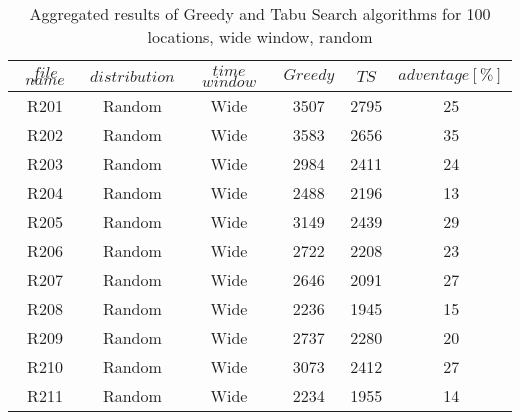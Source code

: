\begin{table}[t]
\centering
\caption{
Aggregated results of Greedy and Tabu Search algorithms for 100 locations, wide window, random}
\begin{tabular*}{0.8\linewidth}{@{\extracolsep{\fill}}cccccc}
\toprule
$file$ $name$ & $distribution$ & $time$ $window$ & $Greedy$ & $TS$ & $adventage[\%]$ \\ \midrule
R201 & Random & Wide & 3507 & 2795 & 25\\
R202 & Random & Wide & 3583 & 2656 & 35\\
R203 & Random & Wide & 2984 & 2411 & 24\\
R204 & Random & Wide & 2488 & 2196 & 13\\
R205 & Random & Wide & 3149 & 2439 & 29\\
R206 & Random & Wide & 2722 & 2208 & 23\\
R207 & Random & Wide & 2646 & 2091 & 27\\
R208 & Random & Wide & 2236 & 1945 & 15\\
R209 & Random & Wide & 2737 & 2280 & 20\\
R210 & Random & Wide & 3073 & 2412 & 27\\
R211 & Random & Wide & 2234 & 1955 & 14\\
\end{tabular*}\end{table}